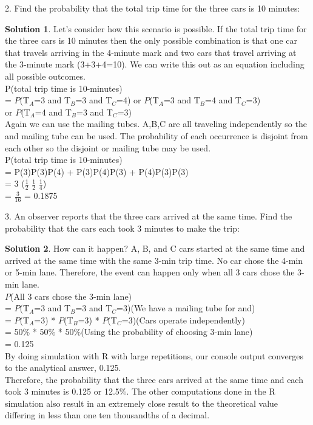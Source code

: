 \documentclass[paper=a4, fontsize=11pt]{scrartcl} %
\numberwithin{equation}{section} %
\numberwithin{figure}{section} %
\numberwithin{table}{section} %
\theoremstyle{definition}
\newtheorem*{solution}{Solution}
\begin{document}
2. Find the probability that the total trip time for the three cars is 10 minutes:
    \begin{solution}
    Let's consider how this scenario is possible. If the total trip time for the three cars is 10 minutes then the only possible combination is that one car that travels arriving in the 4-minute mark and two cars that travel arriving at the 3-minute mark (3+3+4=10). We can write this out as an equation including all possible outcomes.\\
    P(total trip time is 10-minutes)\\
    = $P$(T${_A}$=3 and T${_B}$=3 and T${_C}$=4)
    or $P$(T${_A}$=3 and T${_B}$=4 and T${_C}$=3)\\
    or $P$(T${_A}$=4 and T${_B}$=3 and T${_C}$=3)\\
    Again we can use the mailing tubes. A,B,C are all traveling independently so the and mailing tube can be used. The probability of each occurrence is disjoint from each other so the disjoint or mailing tube may be used.\\
    P(total trip time is 10-minutes)\\
    = P(3)P(3)P(4) + P(3)P(4)P(3) + P(4)P(3)P(3)\\
    = 3 (\( \displaystyle \frac{1}{2} \) \times \( \displaystyle \frac{1}{2} \) \times \( \displaystyle \frac{1}{4} \))\\
    = \( \displaystyle \frac{3}{16} \) = 0.1875
    
    \end{solution}

3. An observer reports that the three cars arrived at the same time. Find the probability that the cars each took 3 minutes to make the trip:
    \begin{solution}
    How can it happen? A, B, and C cars started at the same time and arrived at the same time with the same 3-min trip time. No car chose the 4-min or 5-min lane. Therefore, the event can happen only when all 3 cars chose the 3-min lane.\\
    $P$(All 3 cars chose the 3-min lane)\\
    = $P$(T${_A}$=3 and T${_B}$=3 and T${_C}$=3)\hspace{34pt}(We have a mailing tube for and)\\
    = $P$(T${_A}$=3) * $P$(T${_B}$=3) * $P$(T${_C}$=3)\hspace{25pt}(Cars operate independently)\\
    = 50\% * 50\% * 50\%\hspace{103pt}(Using the probability of choosing 3-min lane)\\
    = 0.125\\
    By doing simulation with R with large repetitions, our console output converges to the analytical answer, 0.125.\\
    Therefore, the probability that the three cars arrived at the same time and each took 3 minutes is 0.125 or 12.5\%.
    The other computations done in the R simulation also result in an extremely close result to the theoretical value differing in less than one ten thousandths of a decimal.
    \end{solution}
\end{document}
